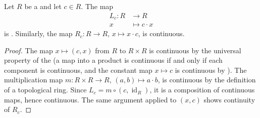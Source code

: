 \begin{lemma} \label{lemma:multiplication_by_fixed_element_in_topological_ring_is_continuous}
    Let $R$ be a  and let $c \in R$. The map
    \begin{align*}
    L_c : R &\to R \\
    x &\mapsto c \cdot x
    \end{align*}
    is . Similarly, the map $R_c : R \to R$, $x \mapsto x \cdot c$, is continuous.
\end{lemma}
\begin{proof}
    The map $x \mapsto (c, x)$ from $R$ to $R \times R$ is continuous by the universal property of the  (a map into a product is continuous if and only if each component is continuous, and the constant map $x \mapsto c$ is continuous by ). The multiplication map $m : R \times R \to R$, $(a,b) \mapsto a \cdot b$, is continuous by the definition of a topological ring. Since $L_c = m \circ (c, \operatorname{id}_R)$, it is a composition of continuous maps, hence continuous. The same argument applied to $(x, c)$ shows continuity of $R_c$.
\end{proof}